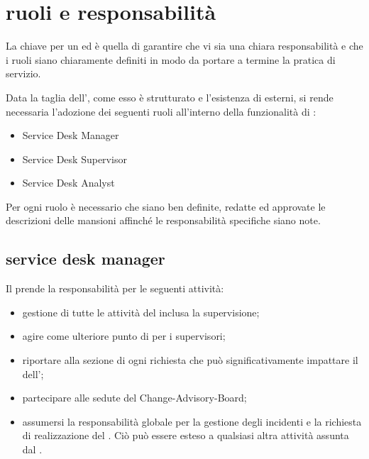 %
%
\section[Ruoli e responsabilità]{ruoli e responsabilità}
\label{sd-roles-responsabilities}
La chiave per un   ed  è quella di garantire che vi sia una chiara responsabilità e che i ruoli siano chiaramente definiti in modo da portare a termine la pratica di servizio.

Data la taglia dell'\entity{}, come esso è strutturato e l'esistenza di  esterni, si rende necessaria l'adozione dei seguenti ruoli all'interno della funzionalità di :

\begin{itemize}
\item{Service Desk Manager}
\item{Service Desk Supervisor}
\item{Service Desk Analyst}
\end{itemize}

Per ogni ruolo è necessario che siano ben definite, redatte ed approvate le descrizioni delle mansioni affinché le responsabilità specifiche siano note.

\subsection[Service Desk Manager]{service desk manager}
\label{sd-sd-manger}
Il  prende la responsabilità per le seguenti attività:

\begin{itemize}
\item{gestione di tutte le attività del  inclusa la supervisione;}
\item{agire come ulteriore punto di  per i supervisori;}
\item{riportare alla sezione di  ogni richiesta che può significativamente impattare il  dell'\entity{};}
\item{partecipare alle sedute del \ac{Change-Advisory-Board};}
\item{assumersi la responsabilità globale per la gestione degli incidenti e la richiesta di realizzazione del . Ciò può essere esteso a qualsiasi altra attività assunta dal .}
\end{itemize}

